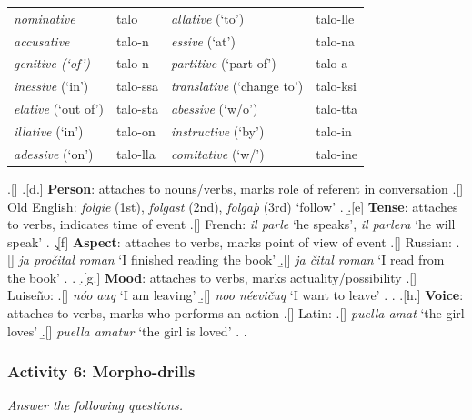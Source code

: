 \documentclass[11pt, oneside]{article}   	%
\begin{document}
\begin{center}	
\begin{tabular}{l l | l l}
{\itshape nominative}	&	talo &	{\itshape allative} (`to') & talo-lle\\
{\itshape accusative}	&	talo-n & {\itshape essive} (`at') & talo-na \\
{\itshape genitive (`of')}	&	talo-n & {\itshape partitive} (`part of')	& talo-a \\
{\itshape inessive} (`in')	& talo-ssa & {\itshape translative} (`change to') & talo-ksi \\
{\itshape elative} (`out of')	&	talo-sta & {\itshape abessive} (`w/o')	& talo-tta \\
{\itshape illative} (`in')	& talo-on & {\itshape instructive} (`by') & talo-in \\
{\itshape adessive} (`on')	& talo-lla & {\itshape comitative} (`w/') & talo-ine \\
\end{tabular}
\end{center}
	
\ex.[] 
\a.[d.] {\bf Person}: attaches to nouns/verbs, marks role of referent in conversation
	\a.[] Old English: {\it folgie} (1st), {\it folgast} (2nd), {\it folgaþ} (3rd) `follow'
	\z.
\b.[e] {\bf Tense}: attaches to verbs, indicates time of event
	\a.[] French: {\it il parle} `he speaks', {\it il parlera} `he will speak'
	\z.
\c.[f] {\bf Aspect}: attaches to verbs, marks point of view of event
	\a.[] Russian:
		\a.[] {\it ja pro{\v c}ital roman} `I finished reading the book'
		\b.[] {\it ja {\v c}ital roman} `I read from the book'
		\z.
	\z.
\d.[g.] {\bf Mood}: attaches to verbs, marks actuality/possibility
	\a.[] Luise{\~ n}o: 
		\a.[] {\it n{\' o}o aaq} `I am leaving'
		\b.[] {\it noo n{\' e}evi{\v c}uq} `I want to leave'
		\z.
	\z.
\e.[h.] {\bf Voice}: attaches to verbs, marks who performs an action
	\a.[] Latin: 	
		\a.[] {\it puella amat} `the girl loves'
		\b.[] {\it puella amatur} `the girl is loved'
		\z.
	\z.
 
\subsubsection{Activity 6: Morpho-drills}

{\itshape Answer the following questions.}
\end{document}

